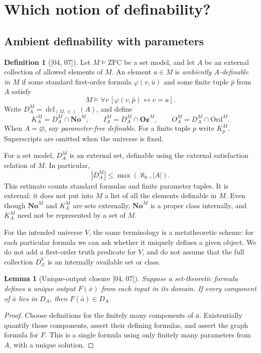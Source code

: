 \documentclass[11pt,a4paper]{article}
\numberwithin{equation}{section}
\newtheorem{lemma}[lemma]{Lemma}
\theoremstyle{definition}
\newtheorem{definition}[definition]{Definition}
\theoremstyle{remark}
\newcommand{\No}{\mathbf{No}}
\newcommand{\Oz}{\mathbf{Oz}}
\newcommand{\Ord}{\mathrm{Ord}}
\newcommand{\ZFC}{\mathrm{ZFC}}
\newcommand{\dcl}{\operatorname{dcl}}
\newcommand{\src}[1]{\textup{\textsf{\small[#1]}}}
\begin{document}
\section{Which notion of definability?}
\label{dsn:sec:definitions}

\subsection{Ambient definability with parameters}

\begin{definition}[\src{04, 07}]\label{dsn:def:ambient}
Let $M\models\ZFC$ be a set model, and let $A$ be an external collection
of allowed elements of $M$. An element $a\in M$ is \emph{ambiently
$A$-definable in $M$} if some standard first-order formula
$\varphi(v,\bar u)$ and some finite tuple $\bar p$ from $A$ satisfy
\[
 M\models\forall v\,[\varphi(v,\bar p)\leftrightarrow v=a].
\]
Write $D_A^M=\dcl_{(M,\in)}(A)$, and define
\[
 K_A^M=D_A^M\cap\No^M,\qquad I_A^M=D_A^M\cap\Oz^M,\qquad
 O_A^M=D_A^M\cap\Ord^M.
\]
When $A=\varnothing$, say \emph{parameter-free definable}. For a finite
tuple $p$ write $K^M_p$. Superscripts are omitted when the universe is
fixed.
\end{definition}

For a set model, $D_A^M$ is an external set, definable using the external
satisfaction relation of $M$. In particular,
\begin{equation}\label{dsn:eq:count}
 |D_A^M|\leq\max(\aleph_0,|A|).
\end{equation}
This estimate counts standard formulas and finite parameter tuples. It is
external: it does not put into $M$ a list of all the elements definable in
$M$. Even though $\No^M$ and $K^M_A$ are sets externally, $\No^M$ is a
proper class internally, and $K^M_A$ need not be represented by a set of
$M$.

For the intended universe $V$, the same terminology is a metatheoretic
scheme: for each particular formula we can ask whether it uniquely
defines a given object. We do not add a first-order truth predicate for
$V$, and do not assume that the full collection $D_\varnothing^V$ is
an internally available set or class.

\begin{lemma}[Unique-output closure \src{04, 07}]\label{dsn:lem:closure}
Suppose a set-theoretic formula defines a unique output $F(\bar x)$
from each input in its domain. If every component of $\bar a$ lies
in $D_A$, then $F(\bar a)\in D_A$.
\end{lemma}
\begin{proof}
Choose definitions for the finitely many components of $\bar a$.
Existentially quantify those components, assert their defining formulas,
and assert the graph formula for $F$. This is a single formula using
only finitely many parameters from $A$, with a unique solution.
\end{proof}
\end{document}
